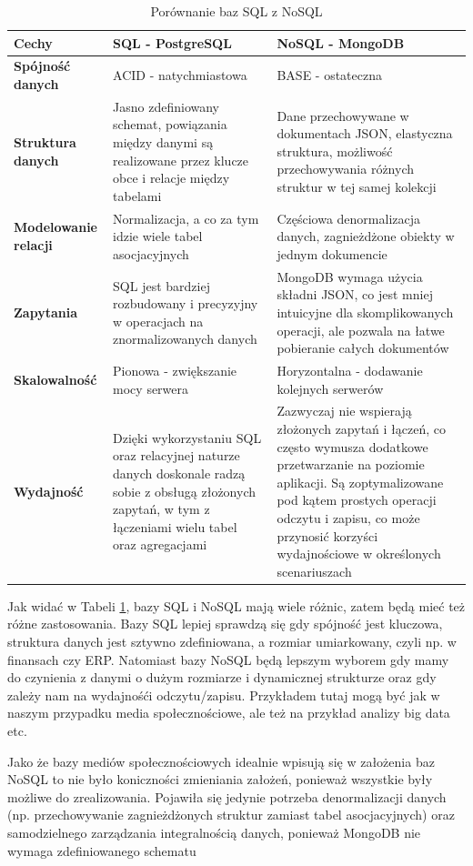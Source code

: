 \documentclass{article}
\begin{document}
\begin{table}[h!]
    \centering
    \begin{tabular}{|p{4cm}|p{5cm}|p{5cm}|}
        \hline
        \textbf{Cechy} & \textbf{SQL - PostgreSQL} & \textbf{NoSQL - MongoDB} \\ \hline
        \textbf{Spójność danych} & ACID - natychmiastowa & BASE - ostateczna \\ \hline
        \textbf{Struktura danych} & Jasno zdefiniowany schemat, powiązania między danymi są realizowane przez klucze obce i relacje między tabelami & Dane przechowywane w dokumentach JSON, elastyczna struktura, możliwość przechowywania różnych struktur w tej samej kolekcji \\ \hline
        \textbf{Modelowanie relacji} &  Normalizacja, a co za tym idzie wiele tabel asocjacyjnych  & Częściowa denormalizacja danych, zagnieżdżone obiekty w jednym dokumencie \\ \hline
        \textbf{Zapytania} & SQL jest bardziej rozbudowany i precyzyjny w operacjach na znormalizowanych danych &  MongoDB wymaga użycia składni JSON, co jest mniej intuicyjne dla skomplikowanych operacji, ale pozwala na łatwe pobieranie całych dokumentów \\ \hline
        \textbf{Skalowalność} & Pionowa - zwiększanie mocy serwera &  Horyzontalna - dodawanie kolejnych serwerów\\ \hline
        \textbf{Wydajność} & Dzięki wykorzystaniu SQL oraz relacyjnej naturze danych doskonale radzą sobie z obsługą złożonych zapytań, w tym z łączeniami wielu tabel oraz agregacjami  &  Zazwyczaj nie wspierają złożonych zapytań i łączeń, co często wymusza dodatkowe przetwarzanie na poziomie aplikacji. Są zoptymalizowane pod kątem prostych operacji odczytu i zapisu, co może przynosić korzyści wydajnościowe w określonych scenariuszach \\ \hline
    \end{tabular}
    \caption{Porównanie baz SQL z NoSQL}
    \label{tab:sql_nosql_comparison}
\end{table}


\quad Jak widać w Tabeli \ref{tab:sql_nosql_comparison}, bazy SQL i NoSQL mają wiele różnic, zatem będą mieć też różne zastosowania. Bazy SQL lepiej sprawdzą się gdy spójność jest kluczowa, struktura danych jest sztywno zdefiniowana, a rozmiar umiarkowany, czyli np. w finansach czy ERP. Natomiast bazy 
NoSQL będą lepszym wyborem gdy mamy do czynienia z danymi o dużym rozmiarze i dynamicznej strukturze oraz gdy zależy nam na wydajnośći odczytu/zapisu. Przykładem tutaj mogą być jak w naszym przypadku media społecznościowe, ale też na przykład analizy big data etc.

\quad Jako że bazy mediów społecznościowych idealnie wpisują się w założenia baz NoSQL to nie było koniczności zmieniania założeń, ponieważ wszystkie były możliwe do zrealizowania. Pojawiła się jedynie potrzeba denormalizacji danych (np. przechowywanie zagnieżdżonych struktur zamiast tabel asocjacyjnych) oraz samodzielnego zarządzania integralnością danych, ponieważ MongoDB nie wymaga zdefiniowanego schematu



\end{document}
